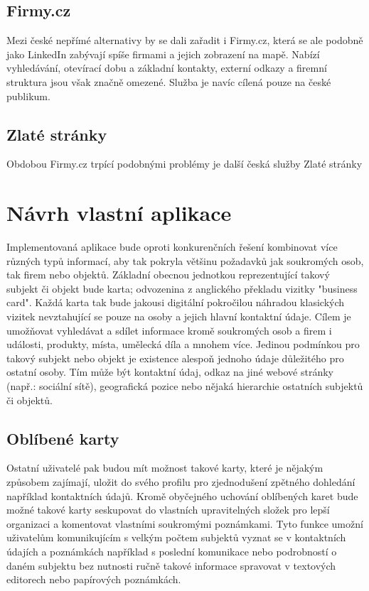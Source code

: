 	\subsection{Firmy.cz}

	Mezi české nepřímé alternativy by se dali zařadit i Firmy.cz, která se ale podobně jako LinkedIn zabývají
	spíše firmami a jejich zobrazení na mapě.
	Nabízí vyhledávání, otevírací dobu a základní kontakty, externí odkazy a firemní struktura jsou však značně omezené.
	Služba je navíc cílená pouze na české publikum.

	\subsection{Zlaté stránky}

	Obdobou Firmy.cz trpící podobnými problémy je další česká služby Zlaté stránky

\section{Návrh vlastní aplikace}

Implementovaná aplikace bude oproti konkurenčních řešení kombinovat více různých typů informací, aby tak pokryla
většinu požadavků jak soukromých osob, tak firem nebo objektů.
Základní obecnou jednotkou reprezentující takový subjekt či objekt bude karta; odvozenina z anglického překladu vizitky "business card".
Každá karta tak bude jakousi digitální pokročilou náhradou klasických vizitek nevztahující se pouze na osoby a jejich
hlavní kontaktní údaje.
Cílem je umožňovat vyhledávat a sdílet informace kromě soukromých osob a firem i události, produkty, místa, umělecká díla a mnohem více.
Jedinou podmínkou pro takový subjekt nebo objekt je existence alespoň jednoho údaje důležitého pro ostatní osoby.
Tím může být kontaktní údaj, odkaz na jiné webové stránky (např.: sociální sítě), geografická pozice nebo
nějaká hierarchie ostatních subjektů či objektů.

	\subsection{Oblíbené karty}

	Ostatní uživatelé pak budou mít možnost takové karty, které je nějakým způsobem zajímají, uložit do svého profilu pro
	zjednodušení zpětného dohledání například kontaktních údajů.
	Kromě obyčejného uchování oblíbených karet bude možné takové karty seskupovat do vlastních upravitelných složek pro
	lepší organizaci a komentovat vlastními soukromými poznámkami.
	Tyto funkce umožní uživatelům komunikujícím s velkým počtem subjektů vyznat se v kontaktních údajích a poznámkách
	například s poslední komunikace nebo podrobností o daném subjektu bez nutnosti ručně takové informace spravovat v
	textových editorech nebo papírových poznámkách.

